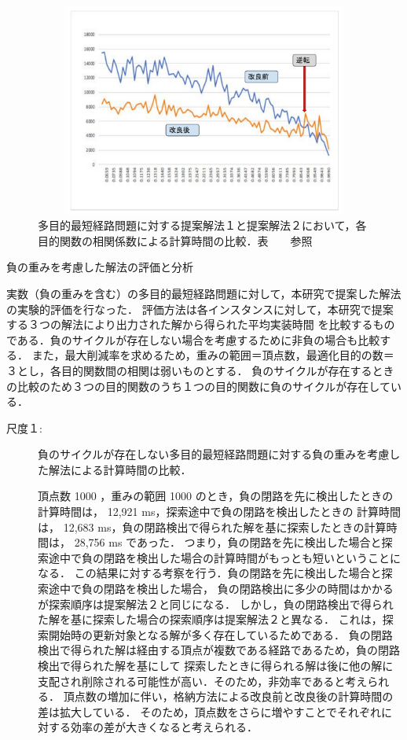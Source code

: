 \documentclass[12pt]{optlab-bachelor}
\begin{document}
\begin{figure}[htbp]
  \centering
  \includegraphics[height=7.0cm , width=15.0cm]{fig/fig18.pdf}
  \caption{多目的最短経路問題に対する提案解法１と提案解法２において，各目的関数の相関係数による計算時間の比較．表　　参照}
\end{figure}


\begin{description}
  \item[負の重みを考慮した解法の評価と分析]
\end{description}

実数（負の重みを含む）の多目的最短経路問題に対して，本研究で提案した解法の実験的評価を行なった．
評価方法は各インスタンスに対して，本研究で提案する３つの解法により出力された解から得られた平均実装時間
を比較するものである．負のサイクルが存在しない場合を考慮するために非負の場合も比較する．
また，最大削減率を求めるため，重みの範囲＝頂点数，最適化目的の数＝３とし，各目的関数間の相関は弱いものとする．
負のサイクルが存在するときの比較のため３つの目的関数のうち１つの目的関数に負のサイクルが存在している．

\begin{description}
  \item[尺度１:]
  負のサイクルが存在しない多目的最短経路問題に対する負の重みを考慮した解法による計算時間の比較．

  頂点数 1000 ，重みの範囲 1000 のとき，負の閉路を先に検出したときの計算時間は， 12,921 ms，探索途中で負の閉路を検出したときの
  計算時間は， 12,683 ms，負の閉路検出で得られた解を基に探索したときの計算時間は， 28,756 ms であった．
  つまり，負の閉路を先に検出した場合と探索途中で負の閉路を検出した場合の計算時間がもっとも短いということになる．
  この結果に対する考察を行う．負の閉路を先に検出した場合と探索途中で負の閉路を検出した場合，
  負の閉路検出に多少の時間はかかるが探索順序は提案解法２と同じになる．
  しかし，負の閉路検出で得られた解を基に探索した場合の探索順序は提案解法２と異なる．
  これは，探索開始時の更新対象となる解が多く存在しているためである．
  負の閉路検出で得られた解は経由する頂点が複数である経路であるため，負の閉路検出で得られた解を基にして
  探索したときに得られる解は後に他の解に支配され削除される可能性が高い．そのため，非効率であると考えられる．
  頂点数の増加に伴い，格納方法による改良前と改良後の計算時間の差は拡大している．
  そのため，頂点数をさらに増やすことでそれぞれに対する効率の差が大きくなると考えられる．

\end{description}
\end{document}
